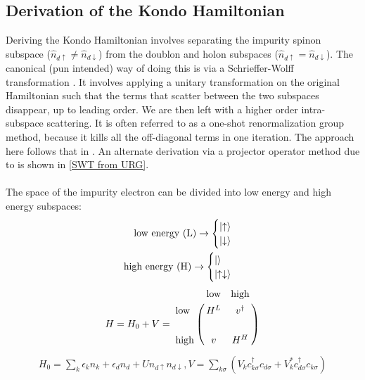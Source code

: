 \documentclass[twoside,11pt]{report}
\numberwithin{equation}{section}
\begin{document}
\subsection{Derivation of the Kondo Hamiltonian}
Deriving the Kondo Hamiltonian involves separating the impurity spinon subspace (\(\hat n_{d\uparrow} \neq \hat n_{d\downarrow}\)) from the doublon and holon subspaces (\(\hat n_{d\uparrow} = \hat n_{d\downarrow}\)). The canonical (pun intended) way of doing this is via a Schrieffer-Wolff transformation \cite{Schrieffer_Wolff}. It involves applying a unitary transformation on the original Hamiltonian such that the terms that scatter between the two subspaces disappear, up to leading order. We are then left with a higher order intra-subspace scattering. It is often referred to as a one-shot renormalization group method, because it kills all the off-diagonal terms in one iteration. The approach here follows that in \cite{piers}. An alternate derivation via a projector operator method due to \cite{hewson} is shown in \ref{SWT from URG}.
\\\\The space of the impurity electron can be divided into low energy and high energy subspaces:
\begin{equation}\begin{aligned}
\text{low energy (L)} \rightarrow \begin{cases} \ket{\uparrow} \\ \ket{\downarrow} \end{cases}\\
\text{high energy (H)} \rightarrow \begin{cases} \ket{} \\ \ket{\uparrow\downarrow} \end{cases}\\
\end{aligned}\end{equation}
\begin{equation}\begin{aligned}
H = H_0 + V = \bordermatrix{~ & \text{low} & \text{high} \cr 
\text{low} & H^L & v^\dagger \cr
       &&\cr
\text{high} & v & H^H }
\end{aligned}\end{equation}
\begin{equation}\begin{aligned}
	H_0 = \sum_{k}\epsilon_k n_{k}+ \epsilon_d n_d + U n_{d\uparrow}n_{d\downarrow}, V=\sum_{k\sigma}\left(V_k c^\dagger_{k\sigma}c_{d\sigma} +V_k^* c^\dagger_{d\sigma}c_{k\sigma}\right)
\end{aligned}\end{equation}
\end{document}
